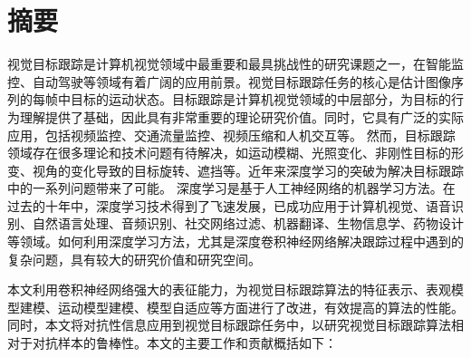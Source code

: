 \maketitle%
\MAKETITLE%
\makedeclaration%
\intobmk\chapter*{摘\quad 要}%
\setcounter{page}{1}%

视觉目标跟踪是计算机视觉领域中最重要和最具挑战性的研究课题之一，在智能监控、自动驾驶等领域有着广阔的应用前景。视觉目标跟踪任务的核心是估计图像序列的每帧中目标的运动状态。目标跟踪是计算机视觉领域的中层部分，为目标的行为理解提供了基础，因此具有非常重要的理论研究价值。同时，它具有广泛的实际应用，包括视频监控、交通流量监控、视频压缩和人机交互等。
然而，目标跟踪领域存在很多理论和技术问题有待解决，如运动模糊、光照变化、非刚性目标的形变、视角的变化导致的目标旋转、遮挡等。近年来深度学习的突破为解决目标跟踪中的一系列问题带来了可能。
深度学习是基于人工神经网络的机器学习方法。在过去的十年中，深度学习技术得到了飞速发展，已成功应用于计算机视觉、语音识别、自然语言处理、音频识别、社交网络过滤、机器翻译、生物信息学、药物设计等领域。如何利用深度学习方法，尤其是深度卷积神经网络解决跟踪过程中遇到的复杂问题，具有较大的研究价值和研究空间。

本文利用卷积神经网络强大的表征能力，为视觉目标跟踪算法的特征表示、表观模型建模、运动模型建模、模型自适应等方面进行了改进，有效提高的算法的性能。同时，本文将对抗性信息应用到视觉目标跟踪任务中，以研究视觉目标跟踪算法相对于对抗样本的鲁棒性。本文的主要工作和贡献概括如下：

